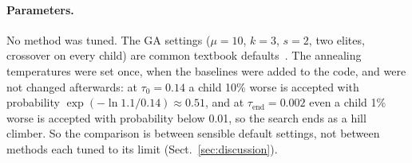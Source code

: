 \paragraph{Parameters.} No method was tuned. The GA settings ($\mu = 10$, $k = 3$, $s = 2$, two elites, crossover on every child) are common textbook defaults~\cite{eiben2015introduction}. The annealing temperatures were set once, when the baselines were added to the code, and were not changed afterwards: at $\tau_0 = 0.14$ a child 10\% worse is accepted with probability $\exp(-\ln 1.1/0.14) \approx 0.51$, and at $\tau_{\mathrm{end}} = 0.002$ even a child 1\% worse is accepted with probability below 0.01, so the search ends as a hill climber. So the comparison is between sensible default settings, not between methods each tuned to its limit (Sect.~\ref{sec:discussion}).
